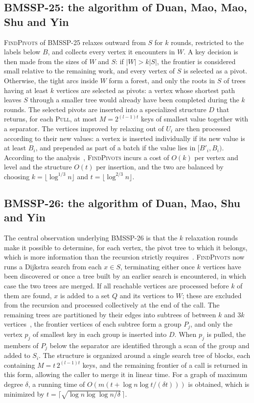 \documentclass[conference,a4paper]{IEEEtran}
\newcommand{\Bp}{B'}
\newcommand{\bmA}{BMSSP-25}
\newcommand{\bmB}{BMSSP-26}
\newcommand{\fp}{\textsc{FindPivots}}
\newcommand{\Oh}{O}
\begin{document}
\subsection{\bmA: the algorithm of Duan, Mao, Mao, Shu and Yin}
\fp{} of \bmA{} relaxes outward from $S$ for $k$ rounds, restricted to the labels below $B$, and
collects every vertex it encounters in $W$. A key decision is then made from the sizes of $W$ and
$S$: if $|W|>k|S|$, the frontier is considered small relative to the remaining work, and every
vertex of $S$ is selected as a pivot. Otherwise, the tight arcs inside $W$ form a forest, and
only the roots in $S$ of trees having at least $k$ vertices are selected as pivots: a vertex whose
shortest path leaves $S$ through a smaller tree would already have been completed during the $k$
rounds. The selected pivots are inserted into a specialized structure $D$ that returns, for each
\textsc{Pull}, at most $M=2^{(l-1)t}$ keys of smallest value together with a separator. The
vertices improved by relaxing out of $U_i$ are then processed according to their new values: a
vertex is inserted individually if its new value is at least $B_i$, and prepended as part of a
batch if the value lies in $[\Bp_i,B_i)$. According to the analysis~\cite{duan2025}, \fp{} incurs
a cost of $\Oh(k)$ per vertex and level and the structure $\Oh(t)$ per insertion, and the two are
balanced by choosing $k=\lfloor\log^{1/3}n\rfloor$ and $t=\lfloor\log^{2/3}n\rfloor$.

\subsection{\bmB: the algorithm of Duan, Mao, Shu and Yin}
The central observation underlying \bmB{} is that the $k$ relaxation rounds make it possible to
determine, for each vertex, the pivot tree to which it belongs, which is more information than the
recursion strictly requires~\cite{duan2026}. \fp{} now runs a Dijkstra search from each $x\in S$,
terminating either once $k$ vertices have been discovered or once a tree built by an earlier
search is encountered, in which case the two trees are merged. If all reachable vertices are
processed before $k$ of them are found, $x$ is added to a set $Q$ and its vertices to $W$; these
are excluded from the recursion and processed collectively at the end of the call. The remaining
trees are partitioned by their edges into subtrees of between $k$ and $3k$
vertices~\cite{frederickson1983}, the frontier vertices of each subtree form a group $P_j$, and
only the vertex $p_j$ of smallest key in each group is inserted into $D$. When $p_j$ is pulled,
the members of $P_j$ below the separator are identified through a scan of the group and added to
$S_i$. The structure is organized around a single search tree of blocks, each containing
$M=t\,2^{(l-1)t}$ keys, and the remaining frontier of a call is returned in this form, allowing
the caller to merge it in linear time. For a graph of maximum degree $\delta$, a running time of
$\Oh(m(t+\log n\log t/(\delta t)))$ is obtained, which is minimized by
$t=\lceil\sqrt{\log n\log\log n/\delta}\,\rceil$.
\end{document}
